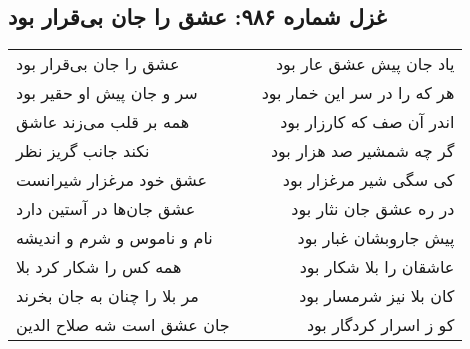 \begin{center}
\section*{غزل شماره ۹۸۶: عشق را جان بی‌قرار بود}
\label{sec:0986}
\begin{longtable}{l p{0.5cm} r}
عشق را جان بی‌قرار بود
&&
یاد جان پیش عشق عار بود
\\
سر و جان پیش او حقیر بود
&&
هر که را در سر این خمار بود
\\
همه بر قلب می‌زند عاشق
&&
اندر آن صف که کارزار بود
\\
نکند جانب گریز نظر
&&
گر چه شمشیر صد هزار بود
\\
عشق خود مرغزار شیرانست
&&
کی سگی شیر مرغزار بود
\\
عشق جان‌ها در آستین دارد
&&
در ره عشق جان نثار بود
\\
نام و ناموس و شرم و اندیشه
&&
پیش جاروبشان غبار بود
\\
همه کس را شکار کرد بلا
&&
عاشقان را بلا شکار بود
\\
مر بلا را چنان به جان بخرند
&&
کان بلا نیز شرمسار بود
\\
جان عشق است شه صلاح الدین
&&
کو ز اسرار کردگار بود
\\
\end{longtable}
\end{center}

